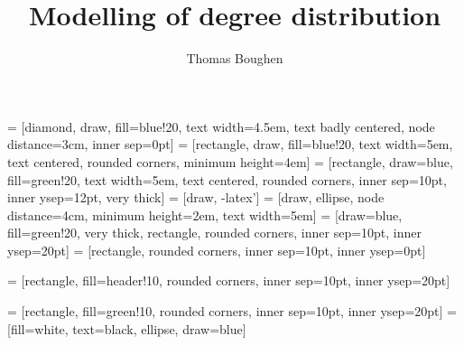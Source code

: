 \documentclass[portrait,a1,posterdraft]{a0poster}
\title{Modelling of degree distribution }
\author{Thomas Boughen}
\date{}
\begin{document}


  \pagestyle{empty}
  \selectfont



  
  \maketitle
  
  
  
  
  
  
   = [diamond, draw, fill=blue!20, text width=4.5em, text badly centered, node distance=3cm, inner sep=0pt]
   = [rectangle, draw, fill=blue!20, text width=5em, text centered, rounded corners, minimum height=4em]
   = [rectangle, draw=blue, fill=green!20, text width=5em, text centered, rounded corners, inner sep=10pt, inner ysep=12pt, very thick]
   = [draw, -latex']
   = [draw, ellipse, node distance=4cm, minimum height=2em, text width=5em]
   = [draw=blue, fill=green!20, very thick, rectangle, rounded corners, inner sep=10pt, inner ysep=20pt]
   = [rectangle, rounded corners, inner sep=10pt, inner ysep=0pt]
  
   = [rectangle, fill=header!10, rounded corners, inner sep=10pt, inner ysep=20pt]
  
   = [rectangle, fill=green!10, rounded corners, inner sep=10pt, inner ysep=20pt]
   = [fill=white, text=black, ellipse, draw=blue]
  
  
  
  
  \small
  
\end{document}
